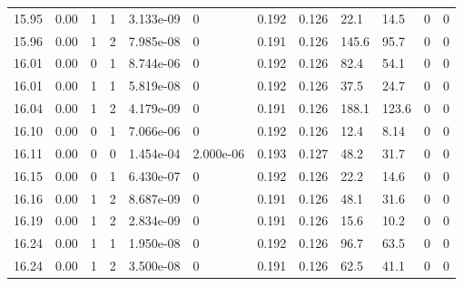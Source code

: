 \documentclass[preview]{standalone}
\begin{document}
{{{{{{{{{{{{\begin{tabular}{L{1.2cm}C{1.2cm} C{0.3cm}C{0.5cm} C{1.4cm}C{1.4cm} C{1.4cm}C{1.4cm} C{1.6cm}C{1.6cm} C{1.6cm}C{1.6cm}}
  15.95  &  0.00  & 1     &  1 &  3.133e-09  & 0  &  0.192&   0.126& 22.1 & 14.5   &  0 & 0  \\ 
  15.96  &  0.00  & 1     &  2 &  7.985e-08  & 0  &  0.191&   0.126& 145.6 & 95.7   &  0 & 0  \\ 
  16.01  &  0.00  & 0     &  1 &  8.744e-06  & 0  &  0.192&   0.126& 82.4 & 54.1   &  0 & 0  \\ 
  16.01  &  0.00  & 1     &  1 &  5.819e-08  & 0  &  0.192&   0.126& 37.5 & 24.7   &  0 & 0  \\ 
  16.04  &  0.00  & 1     &  2 &  4.179e-09  & 0  &  0.191&   0.126& 188.1 & 123.6   &  0 & 0  \\ 
  16.10  &  0.00  & 0     &  1 &  7.066e-06  & 0  &  0.192&   0.126& 12.4 & 8.14   &  0 & 0  \\ 
  16.11  &  0.00  & 0     &  0 &  1.454e-04  & 2.000e-06  &  0.193&   0.127& 48.2 & 31.7   &  0 & 0  \\ 
  16.15  &  0.00  & 0     &  1 &  6.430e-07  & 0  &  0.192&   0.126& 22.2 & 14.6   &  0 & 0  \\ 
  16.16  &  0.00  & 1     &  2 &  8.687e-09  & 0  &  0.191&   0.126& 48.1 & 31.6   &  0 & 0  \\ 
  16.19  &  0.00  & 1     &  2 &  2.834e-09  & 0  &  0.191&   0.126& 15.6 & 10.2   &  0 & 0  \\ 
  16.24  &  0.00  & 1     &  1 &  1.950e-08  & 0  &  0.192&   0.126& 96.7 & 63.5   &  0 & 0  \\ 
  16.24  &  0.00  & 1     &  2 &  3.500e-08  & 0  &  0.191&   0.126& 62.5 & 41.1   &  0 & 0  \\ 
\hline 
\end{tabular} 

}}}}}}}}}}}}
\end{document}
